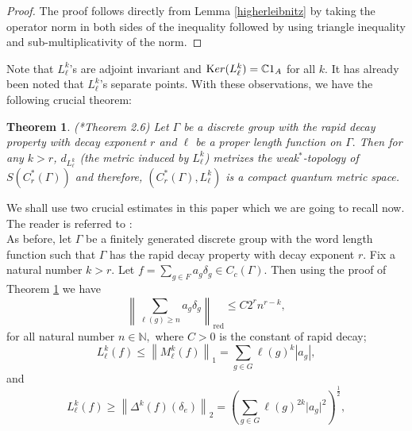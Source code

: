 \documentclass[a4paper,11pt,reqno]{amsart}
\theoremstyle{plain}
\newtheorem{thm}{Theorem}[section]
\theoremstyle{mainthmstyle}
\theoremstyle{named}
\numberwithin{equation}{section}
\begin{document}
\begin{proof}
The proof follows directly from Lemma \ref{higherleibnitz} by taking the operator norm in both sides of the inequality followed by using triangle inequality and sub-multiplicativity of the norm.
\end{proof}
Note that $L^{k}_{\ell}$'s are adjoint invariant and ${\textrm Ker}(L^{k}_{\ell})=\mathbb{C}1_{A}$ for all $k$. It has already been noted that $L^{k}_{\ell}$'s separate points. With these observations, we have the following crucial theorem:
\begin{thm}\label{CQMSmain}(\cite{Christensen}*{Theorem 2.6})
    Let $\Gamma$ be a discrete group with the rapid decay property with decay exponent $r$ and $\ell$ be a proper length function on $\Gamma.$ Then for any $k>r$, $d_{L^{k}_{\ell}}$ (the metric induced by $L_{\ell}^{k}$) metrizes the weak$^{\ast}$-topology of $S(C^{\ast}_{r}(\Gamma))$ and therefore, $(C_{r}^{\ast}(\Gamma),L_{\ell}^{k})$ is a compact quantum metric space.
\end{thm}
We shall use two crucial estimates in this paper which we are going to recall now. The reader is referred to \cite{Christensen}:\\
As before, let $\Gamma$ be a finitely generated discrete group with the word length function such that $\Gamma$ has the rapid decay property with decay exponent $r$. Fix a natural number $k>r$. 
Let $f=\sum\limits_{g\in F} a_{g}\delta_{g}\in C_{c}(\Gamma)$. Then using the proof of Theorem \ref{CQMSmain} we have
\begin{equation} \label{eqn 2.0}
\left \|\sum\limits_{\ell (g) \geq n} a_{g} \delta_{g} \right \|_{\mathrm {red}} \leq C 2^{r} n^{r - k}, 
\end{equation} for all natural number $n \in \mathbb N,$ where $C > 0$ is the constant of rapid decay;
\begin{equation} \label{eqn 2.1}
L_{\ell}^{k} (f) \leq \left \|M_{\ell}^{k} (f) \right \|_{1} = \sum\limits_{g \in G} \ell (g)^{k} \left \lvert a_{g} \right \rvert,
\end{equation} and
\begin{equation}\label{Lbound}L^{k}_{\ell}(f)\geq \left \|\Delta^{k}(f)(\delta_{e}) \right \|_{2}= \left (\sum_{g\in G}\ell(g)^{2k}\lvert a_{g}\rvert^{2}\right)^{\frac{1}{2}},\end{equation}
\end{document}
